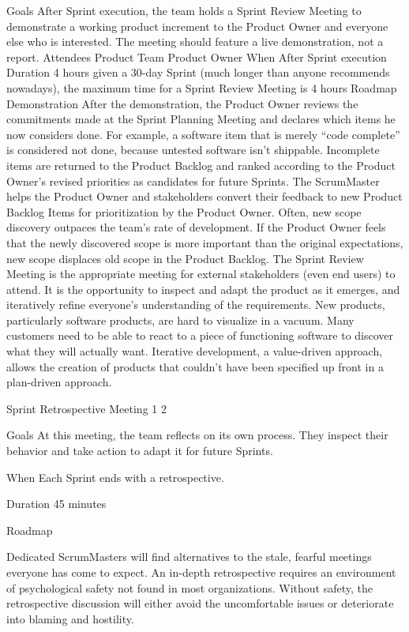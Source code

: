 Goals
After Sprint execution, the team holds a Sprint Review Meeting to demonstrate a working product increment to the Product Owner and everyone else who is interested.
The meeting should feature a live demonstration, not a report.
Attendees
Product Team
Product Owner
When
After Sprint execution
Duration
4 hours
given a 30-day Sprint (much longer than anyone recommends nowadays), the maximum time for a Sprint Review Meeting is 4 hours
Roadmap
Demonstration
After the demonstration, the Product Owner reviews the commitments made at the Sprint Planning Meeting and declares which items he now considers done.
For example, a software item that is merely “code complete” is considered not done, because untested software isn’t shippable. Incomplete items are returned to the Product Backlog and ranked according to the Product Owner’s revised priorities as candidates for future Sprints.
The ScrumMaster helps the Product Owner and stakeholders convert their feedback to new Product Backlog Items for prioritization by the Product Owner.
Often, new scope discovery outpaces the team’s rate of development. If the Product Owner feels that the newly discovered scope is more important than the original expectations, new scope displaces old scope in the Product Backlog.
The Sprint Review Meeting is the appropriate meeting for external stakeholders (even end users) to attend. It is the opportunity to inspect and adapt the product as it emerges, and iteratively refine everyone’s understanding of the requirements. New products, particularly software products, are hard to visualize in a vacuum. Many customers need to be able to react to a piece of functioning software to discover what they will actually want. Iterative development, a value-driven approach, allows the creation of products that couldn’t have been specified up front in a plan-driven approach.

Sprint Retrospective Meeting 1 2


Goals
At this meeting, the team reflects on its own process. They inspect their behavior and take action to adapt it for future Sprints.

When
Each Sprint ends with a retrospective.

Duration
45 minutes


Roadmap


Dedicated ScrumMasters will find alternatives to the stale, fearful meetings everyone has come to expect. An in-depth retrospective requires an environment of psychological safety not found in most organizations. Without safety, the retrospective discussion will either avoid the uncomfortable issues or deteriorate into blaming and hostility.

